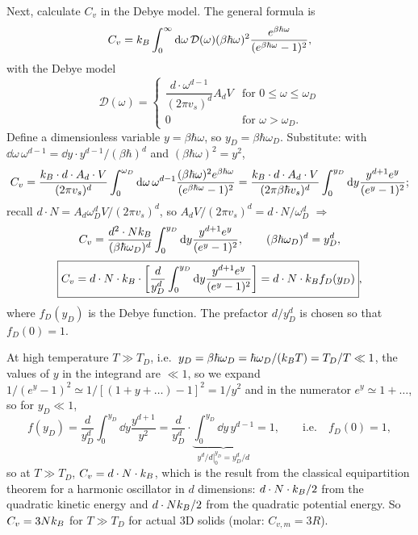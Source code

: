 Next, calculate $C_v$ in the Debye model. The general formula is
\begin{equation}
  C_v = k_{B}\int_0^\infty\mathop{}\!\mathrm{d}\omega\,\mathcal D(\omega)(\beta\hbar\omega)^2\frac{e^{\beta\hbar\omega}}{(e^{\beta\hbar\omega}-1)^2},
\end{equation}
with the Debye model
\begin{equation}
  \mathcal D(\omega) = \begin{cases}\dfrac{d\cdot\omega^{d-1}}{(2\pi v_s)^d}A_dV & \text{for } 0\le\omega\le\omega_D\\[6pt]
                                    0 & \text{for } \omega>\omega_D .\end{cases}
\end{equation}
Define a dimensionless variable $y = \beta\hbar\omega$, so $y_D = \beta\hbar\omega_D$. Substitute: with
$\dd\omega\,\omega^{d-1} = \dd y\cdot y^{d-1}/(\beta\hbar)^d$ and $(\beta\hbar\omega)^2 = y^2$,
\begin{equation}
  C_v = \frac{k_{B}\cdot d\cdot A_d\cdot V}{(2\pi v_s)^d}\int_0^{\omega_D}\mathop{}\!\mathrm{d}\omega\,\omega^{d-1}\frac{(\beta\hbar\omega)^2e^{\beta\hbar\omega}}{(e^{\beta\hbar\omega}-1)^2}
      = \frac{k_{B}\cdot d\cdot A_d\cdot V}{(2\pi\beta\hbar v_s)^d}\int_0^{y_D}\mathop{}\!\mathrm{d} y\frac{y^{d+1}e^y}{(e^y-1)^2};
\end{equation}
recall $d\cdot N = A_d\omega_D^dV/(2\pi v_s)^d$, so $A_dV/(2\pi v_s)^d = d\cdot N/\omega_D^d$
$\Rightarrow$
\begin{equation}
  C_v = \frac{d^2\cdot Nk_{B}}{(\beta\hbar\omega_D)^d}\int_0^{y_D}\mathop{}\!\mathrm{d} y\frac{y^{d+1}e^y}{(e^y-1)^2},
  \qquad(\beta\hbar\omega_D)^d = y_D^d,
\end{equation}
\begin{equation}
  \boxed{C_v = d\cdot N\cdot k_{B}\cdot\left[\frac{d}{y_D^d}\int_0^{y_D}\mathop{}\!\mathrm{d} y\frac{y^{d+1}e^y}{(e^y-1)^2}\right] = d\cdot N\cdot k_{B} f_D(y_D)},
\end{equation}
where $f_D(y_D)$ is the Debye function. The prefactor $d/y_D^d$ is chosen so that $f_D(0) = 1$.

At high temperature $T\gg T_D$, i.e.\ $y_D = \beta\hbar\omega_D = \hbar\omega_D/(k_{B} T) = T_D/T\ll 1$, the values of $y$ in
the integrand are $\ll 1$, so we expand $1/(e^y-1)^2\simeq1/[(1+y+\ldots)-1]^2 = 1/y^2$ and in the numerator
$e^y\simeq 1+\ldots$, so for $y_D\ll 1$,
\begin{equation}
  f(y_D) = \frac{d}{y_D^d}\int_0^{y_D}\dd y\frac{y^{d+1}}{y^2} = \frac{d}{y_D^d}\cdot\underbrace{\int_0^{y_D}\dd y\,y^{d-1}}_{\left.y^d/d\right|_0^{y_D} = y_D^d/d} = 1,
  \qquad\text{i.e.}\quad f_D(0) = 1,
\end{equation}
so at $T\gg T_D$, $C_v = d\cdot N\cdot k_{B}$, which is the result from the classical equipartition theorem for a harmonic oscillator in $d$
dimensions: $d\cdot N\cdot k_{B}/2$ from the quadratic kinetic energy and $d\cdot Nk_{B}/2$ from the quadratic potential
energy. So $C_v = 3Nk_{B}$ for $T\gg T_D$ for actual 3D solids (molar: $C_{v,m} = 3R$).

